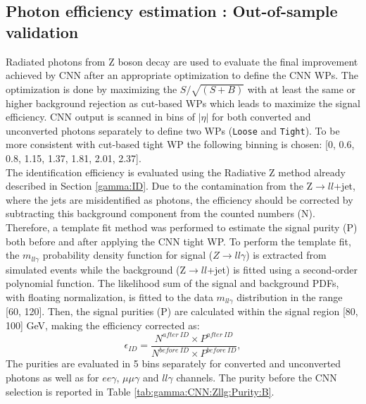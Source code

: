 \subsection{Photon efficiency estimation : Out-of-sample validation}
\label{gamma:CNN:Zllg}
Radiated photons from Z boson decay are used to evaluate the final improvement achieved by CNN after an appropriate optimization to define the CNN WPs. The optimization is done by maximizing the $S/\sqrt{(S+B)}$ with at least the same or higher background rejection as cut-based WPs which leads to maximize the signal efficiency. CNN output is scanned in bins of $|\eta|$ for both converted and unconverted photons separately to define two WPs (\texttt{Loose} and \texttt{Tight}). To be more consistent with cut-based tight WP the following binning is chosen: [0, 0.6, 0.8, 1.15, 1.37, 1.81, 2.01, 2.37]. \\
The identification efficiency is evaluated using the Radiative Z method already described in Section \ref{gamma:ID}. Due to the contamination from the Z$\rightarrow ll$+jet, where the jets are misidentified as photons, the efficiency should be corrected by subtracting this background component from the counted numbers (N). Therefore, a template fit method was performed to estimate the signal purity (P) both before and after applying the CNN tight WP. To perform the template fit, the $m_{ll\gamma}$ probability density function for signal ($Z\rightarrow ll\gamma$) is extracted from simulated events while the background (Z$\rightarrow ll$+jet) is fitted using a second-order polynomial function. The likelihood sum of the signal and background PDFs, with floating normalization, is fitted to the data $m_{ll\gamma}$ distribution in the range [60, 120]. Then, the signal purities (P) are calculated within the signal region [80, 100] GeV, making the efficiency corrected as: 
\begin{equation}
    \epsilon_{ID} = \frac{N^{after \ ID}\times P^{after \ ID}}{N^{before \ ID} \times P^{before \ ID}},
\end{equation}
The purities are evaluated in 5 \eT bins separately for converted and unconverted photons as well as for $ee\gamma$, $\mu\mu\gamma$ and $ll\gamma$ channels. The purity before the CNN selection is reported in Table \ref{tab:gamma:CNN:Zllg:Purity:B}. \\
